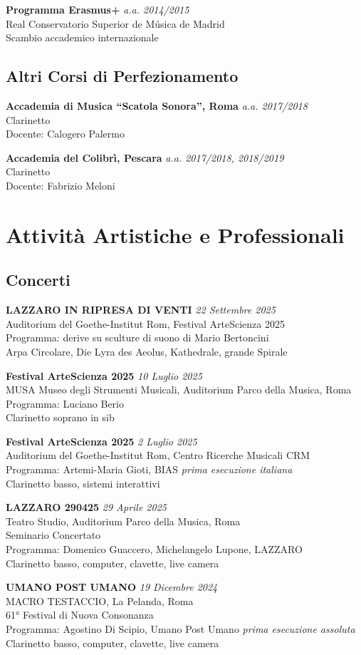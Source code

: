 \documentclass[11pt,a4paper]{article}
\newcommand{\cvitem}[4]{%
    \textbf{#1} \hfill \textit{#2}\\
    #3\\
    #4\vspace{0.3em}
}
\newcommand{\cvevent}[3]{%
    \textbf{#1} \hfill \textit{#2}\\
    #3\vspace{0.3em}
}
\begin{document}
\cvitem{Programma Erasmus+}{a.a. 2014/2015}
{Real Conservatorio Superior de Música de Madrid}
{Scambio accademico internazionale}

\subsection{Altri Corsi di Perfezionamento}

\cvitem{Accademia di Musica ``Scatola Sonora'', Roma}{a.a. 2017/2018}
{Clarinetto}{Docente: Calogero Palermo}

\cvitem{Accademia del Colibrì, Pescara}{a.a. 2017/2018, 2018/2019}
{Clarinetto}{Docente: Fabrizio Meloni}

\section{Attività Artistiche e Professionali}

\subsection{Concerti}

\cvevent{LAZZARO IN RIPRESA DI VENTI}{22 Settembre 2025}
{Auditorium del Goethe-Institut Rom, Festival ArteScienza 2025\\
Programma: derive su sculture di suono di Mario Bertoncini\\
Arpa Circolare, Die Lyra des Aeolus, Kathedrale, grande Spirale}

\cvevent{Festival ArteScienza 2025}{10 Luglio 2025}
{MUSA Museo degli Strumenti Musicali, Auditorium Parco della Musica, Roma\\
Programma: Luciano Berio\\
Clarinetto soprano in sib}

\cvevent{Festival ArteScienza 2025}{2 Luglio 2025}
{Auditorium del Goethe-Institut Rom, Centro Ricerche Musicali CRM\\
Programma: Artemi-Maria Gioti, BIAS \emph{prima esecuzione italiana}\\
Clarinetto basso, sistemi interattivi}

\cvevent{LAZZARO 290425}{29 Aprile 2025}
{Teatro Studio, Auditorium Parco della Musica, Roma\\
Seminario Concertato\\
Programma: Domenico Guaccero, Michelangelo Lupone, LAZZARO\\
Clarinetto basso, computer, clavette, live camera}

\cvevent{UMANO POST UMANO}{19 Dicembre 2024}
{MACRO TESTACCIO, La Pelanda, Roma\\
61° Festival di Nuova Consonanza\\
Programma: Agostino Di Scipio, Umano Post Umano \emph{prima esecuzione assoluta}\\
Clarinetto basso, computer, clavette, live camera}
\end{document}
